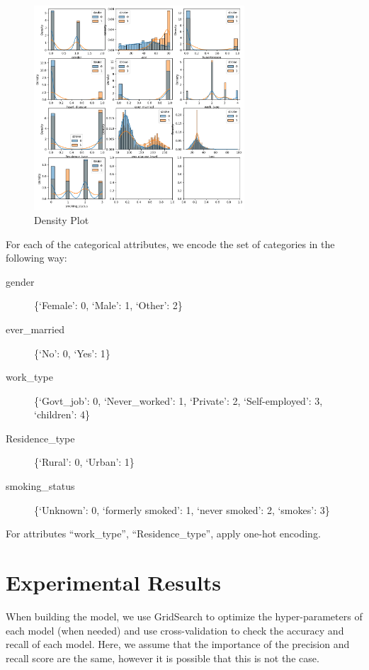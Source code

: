 \documentclass[11pt]{article}
\begin{document}
\begin{figure}[ht]
\centering
\includegraphics[width=0.7\textwidth]{Density.png}
\caption{Density Plot}
\end{figure}

For each of the categorical attributes, we encode the set of categories in the following way:
\begin{description}
    \item[gender] \{`Female': 0, `Male': 1, `Other': 2\}
    \item[ever\_married] \{`No': 0, `Yes': 1\}
    \item[work\_type] \{`Govt\_job': 0, `Never\_worked': 1, `Private': 2, `Self-employed': 3, `children': 4\}
    \item[Residence\_type] \{`Rural': 0, `Urban': 1\}
    \item[smoking\_status] \{`Unknown': 0, `formerly smoked': 1, `never smoked': 2, `smokes': 3\}
\end{description}
For attributes ``work\_type'', ``Residence\_type'', apply one-hot encoding.

\section*{Experimental Results}

When building the model, we use GridSearch to optimize the hyper-parameters of each model (when needed) and use cross-validation to check the accuracy and recall of each model.
Here, we assume that the importance of the precision and recall score are the same, however it is possible that this is not the case.

\medskip
\end{document}
